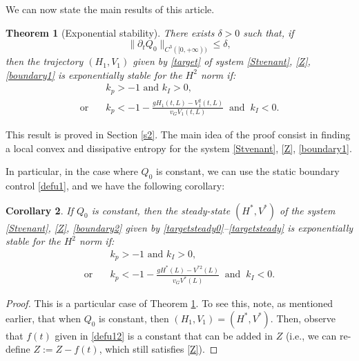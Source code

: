 \documentclass[11pt]{article}
\newcommand{\ie}{i.e.,\xspace}
\numberwithin{equation}{section}
\newtheorem{thm}{Theorem}[section]
\newtheorem{cor}[thm]{Corollary}
\theoremstyle{definition}
\begin{document}
We can now state the main results of this article.

\begin{thm}[Exponential stability]\label{th1}
There exists $\delta>0$ such that, if
\[
\lVert\partial_{t}Q_{0}\rVert_{C^{3}([0,+\infty))}\leq \delta,
\]
then the trajectory $(H_{1},V_{1})$ given by \eqref{target} of system \eqref{Stvenant}, \eqref{Z}, \eqref{boundary1} is exponentially stable for the $H^{2}$ norm if:
\begin{equation}
\begin{split}
&k_{p}>-1\text{ and }k_{I}>0,\\
\text{or}\quad&k_{p}<-1-\frac{gH_{1}(t,L)-V^{2}_{1}(t,L)}{v_{G}V_{1}(t,L)}\;\;\text{and}\;\;k_{I}<0.
\end{split}
\label{cond}
\end{equation}
\end{thm}
This result is proved in Section \ref{s2}.
The main idea of the proof consist in finding a local convex and dissipative entropy for the system \eqref{Stvenant}, \eqref{Z}, \eqref{boundary1}.

In particular, in the case where $Q_{0}$ is constant, we can use the static boundary control \eqref{defu1}, and we have the following corollary:
\begin{cor}\label{cor1}
If $Q_{0}$ is constant, then the steady-state $(H^{*},V^{*})$ of the system \eqref{Stvenant}, \eqref{Z}, \eqref{boundary2} given by \eqref{targetsteady0}--\eqref{targetsteady}
is exponentially stable for the $H^{2}$ norm if:
\begin{equation}
\label{cond1}
\begin{split}
&k_{p}>-1\text{ and }k_{I}>0,\\
\text{or}\quad&k_{p}<-1-\frac{gH^{*}(L)-V^{*2}(L)}{v_{G}V^{*}(L)}\;\;\text{and}\;\;k_{I}<0.
\end{split}
\end{equation}
\end{cor}
\begin{proof}
This is a particular case of Theorem \ref{th1}. To see this, note, as mentioned earlier, that when $Q_{0}$ is constant, then $(H_{1},V_{1})=(H^{*},V^{*})$.
Then, observe that $f(t)$ given in \eqref{defu12} is a constant that can be added in $Z$ (\ie we can re-define $Z:=Z-f(t)$, which still satisfies \eqref{Z}).
\end{proof}
\end{document}
